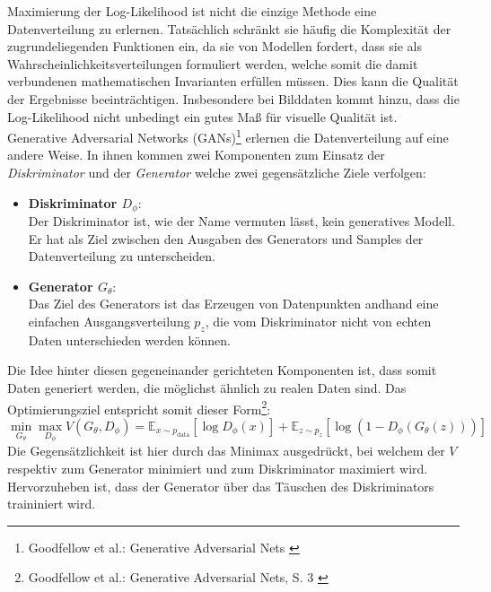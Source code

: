 Maximierung der Log-Likelihood ist nicht die einzige Methode eine Datenverteilung zu erlernen. Tatsächlich schränkt sie häufig die Komplexität der zugrundeliegenden Funktionen ein, da sie von Modellen fordert, dass sie als Wahrscheinlichkeitsverteilungen formuliert werden, welche somit die damit verbundenen mathematischen Invarianten erfüllen müssen. Dies kann die Qualität der Ergebnisse beeinträchtigen. Insbesondere bei Bilddaten kommt hinzu, dass die Log-Likelihood nicht unbedingt ein gutes Maß für visuelle Qualität ist.\\
Generative Adversarial Networks (GANs)\footnote{
    Goodfellow et al.: Generative Adversarial Nets
    \cite{goodfellow2014generativeadversarialnetworks}
} erlernen die Datenverteilung auf eine andere Weise. In ihnen kommen zwei Komponenten zum Einsatz der \textit{Diskriminator} und der \textit{Generator} welche zwei gegensätzliche Ziele verfolgen:
\begin{itemize}
    \item \textbf{Diskriminator $D_\phi$}: \\
    Der Diskriminator ist, wie der Name vermuten lässt, kein generatives Modell. Er hat als Ziel zwischen den Ausgaben des Generators und Samples der Datenverteilung zu unterscheiden.
    \item \textbf{Generator $G_\theta$}: \\
    Das Ziel des Generators ist das Erzeugen von Datenpunkten andhand eine einfachen Ausgangsverteilung $p_z$, die vom Diskriminator nicht von echten Daten unterschieden werden können. 
\end{itemize}
Die Idee hinter diesen gegeneinander gerichteten Komponenten ist, dass somit Daten generiert werden, die möglichst ähnlich zu realen Daten sind. Das Optimierungsziel entspricht somit dieser Form\footnote{
    Goodfellow et al.: Generative Adversarial Nets, S. 3
    \cite{goodfellow2014generativeadversarialnetworks}
}:
\begin{equation}
    \min_{G_\theta}\max_{D_\phi}V(G_\theta, D_\phi)
    = \mathbb E_{x \sim p_\text{data}}[\log D_\phi(x)] 
    + \mathbb E_{z \sim p_z}[\log (1 - D_\phi(G_\theta(z)))]
\end{equation}
Die Gegensätzlichkeit ist hier durch das Minimax ausgedrückt, bei welchem der $V$ respektiv zum Generator minimiert und zum Diskriminator maximiert wird. Hervorzuheben ist, dass der Generator über das Täuschen des Diskriminators traininiert wird. \\

